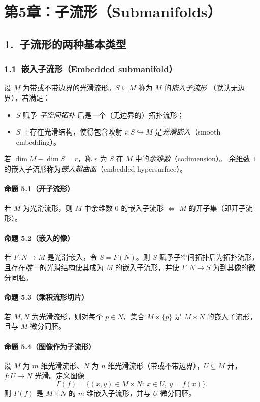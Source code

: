 \documentclass[11pt,a4paper]{article}
\begin{document}




\section*{第5章：子流形（Submanifolds）}

\subsection*{1.\ 子流形的两种基本类型}

\subsubsection*{1.1\ 嵌入子流形（Embedded submanifold）}
设 $M$ 为带或不带边界的光滑流形。$S\subseteq M$ 称为 $M$ 的\emph{嵌入子流形}
（默认无边界），若满足：
\begin{itemize}
  \item $S$ 赋予 \emph{子空间拓扑} 后是一个（无边界的）拓扑流形；
  \item $S$ 上存在光滑结构，使得包含映射 $i:S\hookrightarrow M$ 是\emph{光滑嵌入}（smooth embedding）。
\end{itemize}
若 $\dim M-\dim S=r$，称 $r$ 为 $S$ 在 $M$ 中的\emph{余维数}（codimension）。
余维数 $1$ 的嵌入子流形称为\emph{嵌入超曲面}（embedded hypersurface）。

\paragraph{命题 5.1（开子流形）}
若 $M$ 为光滑流形，则 $M$ 中余维数 $0$ 的嵌入子流形\; $\Longleftrightarrow$\; $M$ 的开子集（即开子流形）。

\paragraph{命题 5.2（嵌入的像）}
若 $F:N\to M$ 是光滑嵌入，令 $S=F(N)$。则 $S$ 赋予子空间拓扑后为拓扑流形，
且存在\emph{唯一}的光滑结构使其成为 $M$ 的嵌入子流形，并使 $F:N\to S$ 为到其像的微分同胚。

\paragraph{命题 5.3（乘积流形切片）}
若 $M,N$ 为光滑流形，则对每个 $p\in N$，集合 $M\times\{p\}$ 是 $M\times N$ 的嵌入子流形，
且与 $M$ 微分同胚。

\paragraph{命题 5.4（图像作为子流形）}
设 $M$ 为 $m$ 维光滑流形、$N$ 为 $n$ 维光滑流形（带或不带边界），$U\subseteq M$ 开，
$f:U\to N$ 光滑。定义图像
\[
\Gamma(f)=\{(x,y)\in M\times N:\ x\in U,\ y=f(x)\}.
\]
则 $\Gamma(f)$ 是 $M\times N$ 的 $m$ 维嵌入子流形，并与 $U$ 微分同胚。
\end{document}
